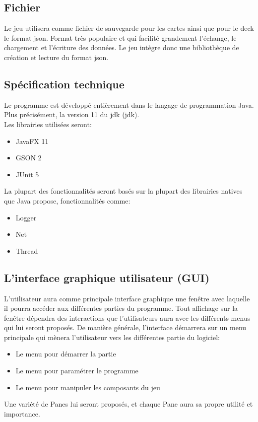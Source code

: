 \subsection{Fichier}
Le jeu utilisera comme fichier de sauvegarde pour les cartes ainsi que pour le deck le format \acrshort{json}. Format très populaire et qui facilité grandement l'échange, le chargement et l'écriture des données. Le jeu intègre donc une bibliothèque 
de création et lecture du format \acrshort{json}.

\subsection{Spécification technique}
Le programme est développé entièrement dans le langage de programmation Java. Plus précisément, la version 11 du \acrshort{jdk}  (\acrlong{jdk}).\\
Les librairies utilisées seront:
\begin{itemize}
	\item JavaFX 11
	\item GSON 2
	\item JUnit 5
\end{itemize}
La plupart des fonctionnalités seront basés sur la plupart des librairies natives que Java propose, fonctionnalités comme:
\begin{itemize}
	\item Logger
	\item Net
	\item Thread
\end{itemize}

\subsection{L'interface graphique utilisateur (GUI)}
L'utilisateur aura comme principale interface graphique une fenêtre avec laquelle il pourra accéder aux différentes parties du programme. Tout affichage sur la fenêtre dépendra des interactions que l'utilisateurs aura avec les différents menus qui lui seront proposés. De manière générale, l'interface démarrera sur un menu principale qui mènera l'utilisateur vers les différentes partie du logiciel:
\begin{itemize}
	\item Le menu pour démarrer la partie
	\item Le menu pour paramétrer le programme
	\item Le menu pour manipuler les composants du jeu
\end{itemize}
Une variété de Panes lui seront proposés, et chaque Pane aura sa propre utilité et importance.
